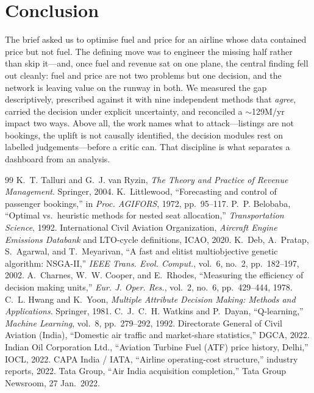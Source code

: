 \documentclass[conference]{IEEEtran}
\newcommand{\EUR}{\texteuro}
\begin{document}
\section{Conclusion}
The brief asked us to optimise fuel and price for an airline whose data contained price but not fuel. The defining move was to engineer the missing half rather than skip it---and, once fuel and revenue sat on one plane, the central finding fell out cleanly: fuel and price are not two problems but one decision, and the network is leaving value on the runway in both. We measured the gap descriptively, prescribed against it with nine independent methods that \emph{agree}, carried the decision under explicit uncertainty, and reconciled a $\sim$\EUR{}129M/yr impact two ways. Above all, the work names what to attack---listings are not bookings, the uplift is not causally identified, the decision modules rest on labelled judgements---before a critic can. That discipline is what separates a dashboard from an analysis.

\begin{thebibliography}{99}
 K.~T. Talluri and G.~J. van Ryzin, \emph{The Theory and Practice of Revenue Management}. Springer, 2004.
 K.~Littlewood, ``Forecasting and control of passenger bookings,'' in \emph{Proc. AGIFORS}, 1972, pp.~95--117.
 P.~P. Belobaba, ``Optimal vs.\ heuristic methods for nested seat allocation,'' \emph{Transportation Science}, 1992.
 International Civil Aviation Organization, \emph{Aircraft Engine Emissions Databank} and LTO-cycle definitions, ICAO, 2020.
 K.~Deb, A.~Pratap, S.~Agarwal, and T.~Meyarivan, ``A fast and elitist multiobjective genetic algorithm: NSGA-II,'' \emph{IEEE Trans. Evol. Comput.}, vol.~6, no.~2, pp.~182--197, 2002.
 A.~Charnes, W.~W. Cooper, and E.~Rhodes, ``Measuring the efficiency of decision making units,'' \emph{Eur. J. Oper. Res.}, vol.~2, no.~6, pp.~429--444, 1978.
 C.~L. Hwang and K.~Yoon, \emph{Multiple Attribute Decision Making: Methods and Applications}. Springer, 1981.
 C.~J.~C.~H. Watkins and P.~Dayan, ``Q-learning,'' \emph{Machine Learning}, vol.~8, pp.~279--292, 1992.
 Directorate General of Civil Aviation (India), ``Domestic air traffic and market-share statistics,'' DGCA, 2022.
 Indian Oil Corporation Ltd., ``Aviation Turbine Fuel (ATF) price history, Delhi,'' IOCL, 2022.
 CAPA India / IATA, ``Airline operating-cost structure,'' industry reports, 2022.
 Tata Group, ``Air India acquisition completion,'' Tata Group Newsroom, 27 Jan.\ 2022.
\end{thebibliography}
\end{document}
